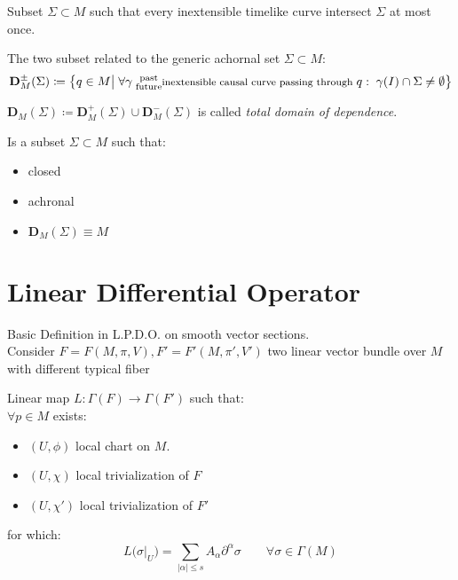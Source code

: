 \documentclass[a4paper,12pt]{scrartcl}    %
\begin{document}
	\begin{definition}
		Subset $\Sigma \subset M$ such that every inextensible timelike curve intersect $\Sigma$ at most once.
	\end{definition}

	\begin{definition}
		The two subset related to the generic achornal set $\Sigma \subset M$:
		\begin{displaymath}		
			\mathbf{D}_M^\pm(\Sigma) \coloneqq \big\{ q \in M \big\vert \; \forall \gamma \substack{\textrm{ past}\\ \textrm{ future} }\textrm{\footnotesize inextensible causal curve passing through }q : \; \gamma(I) \cap \Sigma \neq \emptyset  \big\}
		\end{displaymath}		
	\end{definition}

	\begin{notationfix}
		$\mathbf{D}_M(\Sigma)  \coloneq \mathbf{D}_M^+(\Sigma) \cup \mathbf{D}_M^-(\Sigma)$ is called \emph{total domain of dependence}.
	\end{notationfix}

	\begin{definition}
		Is a subset $\Sigma \subset M$ such that:
		\begin{itemize}
			\item closed
			\item achronal
			\item $\mathbf{D}_M(\Sigma) \equiv M$
		\end{itemize}
	\end{definition}

\section{Linear Differential Operator}
Basic Definition in L.P.D.O. on smooth vector sections.
\\
Consider $F=F(M,\pi,V), F'=F'(M,\pi',V')$ two linear vector bundle over $M$ with different typical fiber
	\begin{definition}
		Linear map $L:\Gamma(F)\rightarrow \Gamma(F')$ such that:
		\\
		$\forall p \in M$ exists:
		\begin{itemize}
			\item $(U, \phi)$ local chart on $M$.
			\item $(U, \chi)$ local trivialization of $F$
			\item $(U, \chi')$ local trivialization of $F'$
		\end{itemize}
		for which:
		\begin{displaymath}
			L \big(\sigma \big\vert_U\big) = \sum_{\vert \alpha \vert \leq s} A_\alpha \partial^\alpha \sigma \qquad \forall \sigma \in \Gamma(M)
		\end{displaymath}
	\end{definition}
\end{document}

